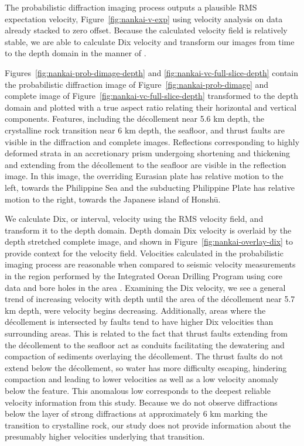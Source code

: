 The probabilistic diffraction imaging process outputs a plausible RMS expectation velocity, Figure~\ref{fig:nankai-v-exp} using velocity analysis on data already stacked to zero offset.  Because the calculated velocity field is relatively stable, we are able to calculate Dix velocity and transform our images from time to the depth domain in the manner of \cite{zone-2018}.  

Figures~\ref{fig:nankai-prob-dimage-depth} and \ref{fig:nankai-vc-full-slice-depth} contain the probabilistic diffraction image of Figure~\ref{fig:nankai-prob-dimage} and complete image of Figure~\ref{fig:nankai-vc-full-slice-depth} transformed to the depth domain and plotted with a true aspect ratio relating their horizontal and vertical components. Features, including the d\'ecollement near 5.6 km depth, the crystalline rock transition near 6 km depth, the seafloor, and thrust faults are visible in the diffraction and complete images. Reflections corresponding to highly deformed strata in an accretionary prism undergoing shortening and thickening and extending from the d\'ecollement to the seafloor are visible in the reflection image.  In this image, the overriding Eurasian plate has relative motion to the left, towards the Philippine Sea and the subducting Philippine Plate has relative motion to the right, towards the Japanese island of Honsh\=u.


We calculate Dix, or interval, velocity using the RMS velocity field, and transform it  to the depth domain.  Depth domain Dix velocity is overlaid by the depth stretched complete image, and shown in Figure~\ref{fig:nankai-overlay-dix} to provide context for the velocity field.  Velocities calculated in the probabilistic imaging process are reasonable when compared to seismic velocity measurements in the region performed by the Integrated Ocean Drilling Program using core data and bore holes in the area \cite[]{IODP-2009}. Examining the Dix velocity, we see a general trend of increasing velocity with depth until the area of the d\'ecollement near 5.7 km depth, were velocity begins decreasing. Additionally, areas where the d\'ecollement is intersected by faults tend to have higher Dix velocities than surrounding areas. This is related to the fact that thrust faults extending from the d\'ecollement to the seafloor act as conduits facilitating the dewatering and compaction of sediments overlaying the d\'ecollement.  The thrust faults do not extend below the d\'ecollement, so water has more difficulty escaping, hindering compaction and leading to lower velocities as well as a low velocity anomaly below the feature.  This anomalous low corresponds to the deepest reliable velocity information from this study.  Because we do not observe diffractions below the layer of strong diffractions at approximately 6 km marking the transition to crystalline rock, our study does not provide information about the presumably higher velocities underlying that transition. 

